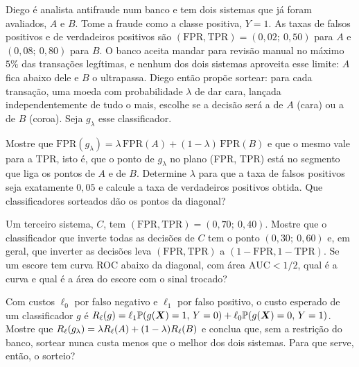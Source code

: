 Diego é analista antifraude num banco e tem dois sistemas que já foram avaliados, $A$ e
$B$. Tome a fraude como a classe positiva, $Y=1$. As taxas de falsos positivos e de
verdadeiros positivos são $(\mathrm{FPR},\mathrm{TPR})=(0{,}02;\ 0{,}50)$ para $A$ e
$(0{,}08;\ 0{,}80)$ para $B$. O banco aceita mandar para revisão manual no máximo $5\%$ das
transações legítimas, e nenhum dos dois sistemas aproveita esse limite: $A$ fica abaixo
dele e $B$ o ultrapassa. Diego então propõe sortear: para cada transação, uma moeda com
probabilidade $\lambda$ de dar cara, lançada independentemente de tudo o mais, escolhe se a
decisão será a de $A$ (cara) ou a de $B$ (coroa). Seja $g_\lambda$ esse classificador.
\begin{itens}
  \item {} Mostre que
        $\mathrm{FPR}(g_\lambda)=\lambda\,\mathrm{FPR}(A)+(1-\lambda)\,\mathrm{FPR}(B)$ e
        que o mesmo vale para a TPR, isto é, que o ponto de $g_\lambda$ no plano
        (FPR, TPR) está no segmento que liga os pontos de $A$ e de $B$. Determine $\lambda$
        para que a taxa de falsos positivos seja exatamente $0{,}05$ e calcule a taxa de
        verdadeiros positivos obtida. Que classificadores sorteados dão os pontos da
        diagonal?
  \item {} Um terceiro sistema, $C$, tem $(\mathrm{FPR},\mathrm{TPR})=(0{,}70;\ 0{,}40)$.
        Mostre que o classificador que inverte todas as decisões de $C$ tem o ponto
        $(0{,}30;\ 0{,}60)$ e, em geral, que inverter as decisões leva
        $(\mathrm{FPR},\mathrm{TPR})$ a $(1-\mathrm{FPR},1-\mathrm{TPR})$. Se um escore tem
        curva ROC abaixo da diagonal, com área $\mathrm{AUC}<1/2$, qual é a curva e qual é a
        área do escore com o sinal trocado?
  \item {} Com custos $\ell_0$ por falso negativo e $\ell_1$ por falso positivo, o
        custo esperado de um classificador $g$ é
        $R_\ell(g)=\ell_1\mathbb{P}(g(\bm{X})=1,\,Y=0)+\ell_0\mathbb{P}(g(\bm{X})=0,\,Y=1)$. Mostre que
        $R_\ell(g_\lambda)=\lambda R_\ell(A)+(1-\lambda)R_\ell(B)$ e conclua
        que, sem a restrição do banco, sortear nunca custa menos que o melhor dos dois
        sistemas. Para que serve, então, o sorteio?
\end{itens}

